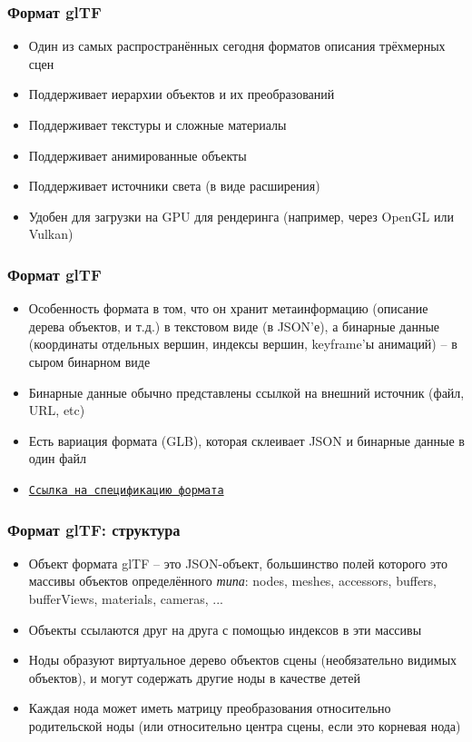 \documentclass[10pt]{beamer}
\begin{document}
\begin{frame}
\frametitle{Формат glTF}
\begin{itemize}
\item Один из самых распространённых сегодня форматов описания трёхмерных сцен
\pause
\item Поддерживает иерархии объектов и их преобразований
\pause
\item Поддерживает текстуры и сложные материалы
\pause
\item Поддерживает анимированные объекты
\pause
\item Поддерживает источники света (в виде расширения)
\pause
\item Удобен для загрузки на GPU для рендеринга (например, через OpenGL или Vulkan)
\end{itemize}
\end{frame}

\begin{frame}
\frametitle{Формат glTF}
\begin{itemize}
\item Особенность формата в том, что он хранит метаинформацию (описание дерева объектов, и т.д.) в текстовом виде (в JSON'е), а бинарные данные (координаты отдельных вершин, индексы вершин, keyframe'ы анимаций) -- в сыром бинарном виде
\pause
\item Бинарные данные обычно представлены ссылкой на внешний источник (файл, URL, etc)
\pause
\item Есть вариация формата (GLB), которая склеивает JSON и бинарные данные в один файл
\pause
\item \href{https://registry.khronos.org/glTF/specs/2.0/glTF-2.0.html}{\texttt{Ссылка на спецификацию формата}}
\end{itemize}
\end{frame}

\begin{frame}
\frametitle{Формат glTF: структура}
\begin{itemize}
\item Объект формата glTF -- это JSON-объект, большинство полей которого это массивы объектов определённого \textit{типа}: nodes, meshes, accessors, buffers, bufferViews, materials, cameras, ...
\pause
\item Объекты ссылаются друг на друга с помощью индексов в эти массивы
\pause
\item Ноды образуют виртуальное дерево объектов сцены (необязательно видимых объектов), и могут содержать другие ноды в качестве детей
\pause
\item Каждая нода может иметь матрицу преобразования относительно родительской ноды (или относительно центра сцены, если это корневая нода)
\end{itemize}
\end{frame}
\end{document}
